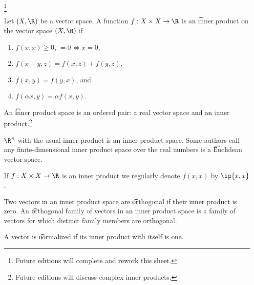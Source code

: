 
\footnote{Future editions will complete and rework this sheet.}


Let $(X, \R)$ be a vector space.
A function $f: X \times X \to \R$ is an \t{inner product} on the vector space $(X, \R)$ if
\begin{enumerate}
  \item $f(x,x) \geq 0$, $= 0 \iff x = 0$,
  \item $f(x+y,z) = f(x,z) + f(y, z)$,
  \item $f(x,y) = f(y,x)$, and
  \item $f(\alpha x,y) = \alpha f(x,y)$.
\end{enumerate}
An \t{inner product space} is an ordered pair: a real vector space and an inner product.\footnote{Future editions will discuss complex inner products.}


$\R^n$ with the usual inner product is an inner product space.
Some authors call any finite-dimensional inner product space over the real numbers is a \t{Euclidean vector space}.


If $f: X \times X \to \R$ is an inner product we regularly denote $f(x, x)$ by $\ip{x,x}$.


Two vectors in an inner product space are \t{orthogonal} if their inner product is zero.
An \t{orthogonal family of vectors} in an inner product space is a family of vectors for which distinct family members are orthogonal.

A vector is \t{normalized} if its inner product with itself is one.

\blankpage
